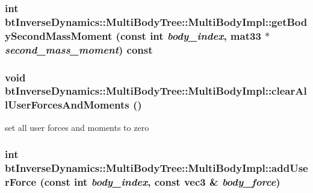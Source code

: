  \hypertarget{classbt_inverse_dynamics_1_1_multi_body_tree_1_1_multi_body_impl_8e530e85b355eb2bee0bdd3256529e28}{
\subsubsection[getBodySecondMassMoment]{\setlength{\rightskip}{0pt plus 5cm}int btInverseDynamics::MultiBodyTree::MultiBodyImpl::getBodySecondMassMoment (const int {\em body\_\-index}, \/  mat33 $\ast$ {\em second\_\-mass\_\-moment}) const}}
\label{classbt_inverse_dynamics_1_1_multi_body_tree_1_1_multi_body_impl_8e530e85b355eb2bee0bdd3256529e28}


 \hypertarget{classbt_inverse_dynamics_1_1_multi_body_tree_1_1_multi_body_impl_b3b1f5f6819d8c5529b4d029ea775d10}{
\subsubsection[clearAllUserForcesAndMoments]{\setlength{\rightskip}{0pt plus 5cm}void btInverseDynamics::MultiBodyTree::MultiBodyImpl::clearAllUserForcesAndMoments ()}}
\label{classbt_inverse_dynamics_1_1_multi_body_tree_1_1_multi_body_impl_b3b1f5f6819d8c5529b4d029ea775d10}


set all user forces and moments to zero  \hypertarget{classbt_inverse_dynamics_1_1_multi_body_tree_1_1_multi_body_impl_4f1786c829da5d57e4758437a38b469c}{
\subsubsection[addUserForce]{\setlength{\rightskip}{0pt plus 5cm}int btInverseDynamics::MultiBodyTree::MultiBodyImpl::addUserForce (const int {\em body\_\-index}, \/  const {\bf vec3} \& {\em body\_\-force})}}
\label{classbt_inverse_dynamics_1_1_multi_body_tree_1_1_multi_body_impl_4f1786c829da5d57e4758437a38b469c}


